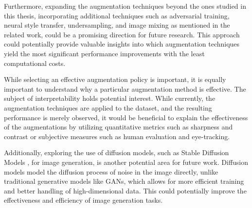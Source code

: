 Furthermore, expanding the augmentation techniques beyond the ones studied in this thesis, incorporating additional techniques such as adversarial training, neural style transfer, undersampling, and image mixing as mentioned in the related work, could be a promising direction for future research. This approach could potentially provide valuable insights into which augmentation techniques yield the most significant performance improvements with the least computational costs.

While selecting an effective augmentation policy is important, it is equally important to understand why a particular augmentation method is effective. The subject of interpretability holds potential interest. While currently, the augmentation techniques are applied to the dataset, and the resulting performance is merely observed, it would be beneficial to explain the effectiveness of the augmentations by utilizing quantitative metrics such as sharpness and contrast or subjective measures such as human evaluation and eye-tracking.

Additionally, exploring the use of diffusion models, such as Stable Diffusion Models \cite{trabucco2023effective}, for image generation, is another potential area for future work. Diffusion models model the diffusion process of noise in the image directly, unlike traditional generative models like GANs, which allows for more efficient training and better handling of high-dimensional data. This could potentially improve the effectiveness and efficiency of image generation tasks.

